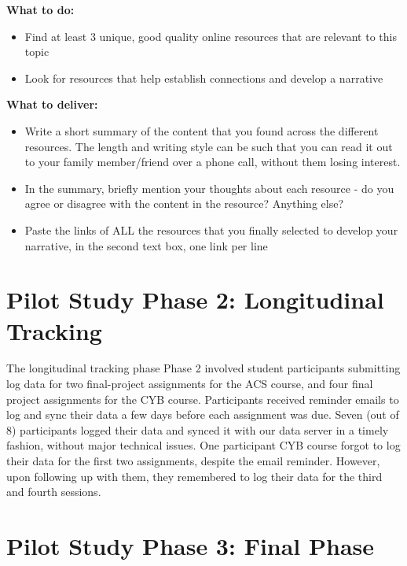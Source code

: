 \documentclass[letterpaper, nobind]{templates/ociamthesis}
\begin{document}
\textbf{What to do:}

\begin{itemize}
\item
  Find at least 3 unique, good quality online resources that are
  relevant to this topic
\item
  Look for resources that help establish connections and develop a
  narrative
\end{itemize}

\textbf{What to deliver:}

\begin{itemize}
\item
  Write a short summary of the content that you found across the
  different resources. The length and writing style can be such that
  you can read it out to your family member/friend over a phone call,
  without them losing interest.
\item
  In the summary, briefly mention your thoughts about each resource -
  do you agree or disagree with the content in the resource? Anything
  else?
\item
  Paste the links of ALL the resources that you finally selected to
  develop your narrative, in the second text box, one link per line
\end{itemize}

\hypertarget{pilot-study-phase-2-longitudinal-tracking}{%
\section{Pilot Study Phase 2: Longitudinal Tracking}\label{pilot-study-phase-2-longitudinal-tracking}}

The longitudinal tracking phase Phase 2 involved student participants
submitting log data for two final-project assignments for the ACS
course, and four final project assignments for the CYB course.
Participants received reminder emails to log and sync their data a few
days before each assignment was due. Seven (out of 8) participants
logged their data and synced it with our data server in a timely
fashion, without major technical issues. One participant CYB course
forgot to log their data for the first two assignments, despite the
email reminder. However, upon following up with them, they remembered to
log their data for the third and fourth sessions.

\hypertarget{sec-app-pilot-ses3}{%
\section{Pilot Study Phase 3: Final Phase}\label{sec-app-pilot-ses3}}
\end{document}

